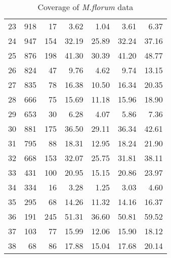 \begin{table}[t]
\begin{tabular}{lrrr|rrr}
   23 & 918 & 17 & 3.62 & 1.04 & 3.61 & 6.37 \\ 
   24 & 947 & 154 & 32.19 & 25.89 & 32.24 & 37.16 \\ 
   25 & 876 & 198 & 41.30 & 30.39 & 41.20 & 48.77 \\ 
   26 & 824 & 47 & 9.76 & 4.62 & 9.74 & 13.15 \\ 
   27 & 835 & 78 & 16.38 & 10.50 & 16.34 & 20.35 \\ 
   28 & 666 & 75 & 15.69 & 11.18 & 15.96 & 18.90 \\ 
   29 & 653 & 30 & 6.28 & 4.07 & 5.86 & 7.36 \\ 
   30 & 881 & 175 & 36.50 & 29.11 & 36.34 & 42.61 \\ 
   31 & 795 & 88 & 18.31 & 12.95 & 18.24 & 21.90 \\ 
   32 & 668 & 153 & 32.07 & 25.75 & 31.81 & 38.11 \\ 
   33 & 431 & 100 & 20.95 & 15.15 & 20.86 & 23.97 \\ 
   34 & 334 & 16 & 3.28 & 1.25 & 3.03 & 4.60 \\ 
   35 & 295 & 68 & 14.26 & 11.32 & 14.16 & 16.37 \\ 
   36 & 191 & 245 & 51.31 & 36.60 & 50.81 & 59.52 \\ 
   37 & 103 & 77 & 15.99 & 12.06 & 15.90 & 18.12 \\ 
   38 &  68 & 86 & 17.88 & 15.04 & 17.68 & 20.14 \\ 
  \hline
  \hline
\end{tabular}
\caption{Coverage of {\emph{M.florum}} data}
\label{tab:App_mftable}
\end{table}


